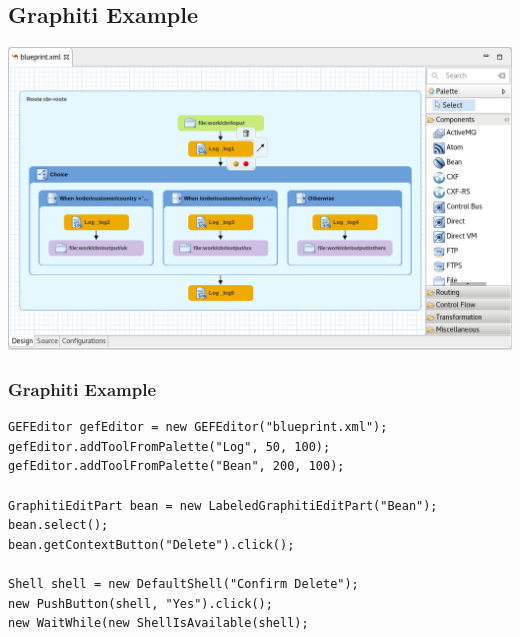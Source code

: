 \documentclass{beamer}
\begin{document}
%
%
%
%


\subsection{Graphiti Example}
\begin{frame}[fragile]
\begin{center}
\includegraphics[width=\textwidth,height=0.8\textheight,keepaspectratio]{fuse_tooling.png}
\end{center}
\end{frame}

\begin{frame}[fragile]
\frametitle{Graphiti Example}
\begin{lstlisting}
GEFEditor gefEditor = new GEFEditor("blueprint.xml");
gefEditor.addToolFromPalette("Log", 50, 100);
gefEditor.addToolFromPalette("Bean", 200, 100);

GraphitiEditPart bean = new LabeledGraphitiEditPart("Bean");
bean.select();
bean.getContextButton("Delete").click();

Shell shell = new DefaultShell("Confirm Delete");
new PushButton(shell, "Yes").click();
new WaitWhile(new ShellIsAvailable(shell);
\end{lstlisting}
\end{frame}
\end{document}
